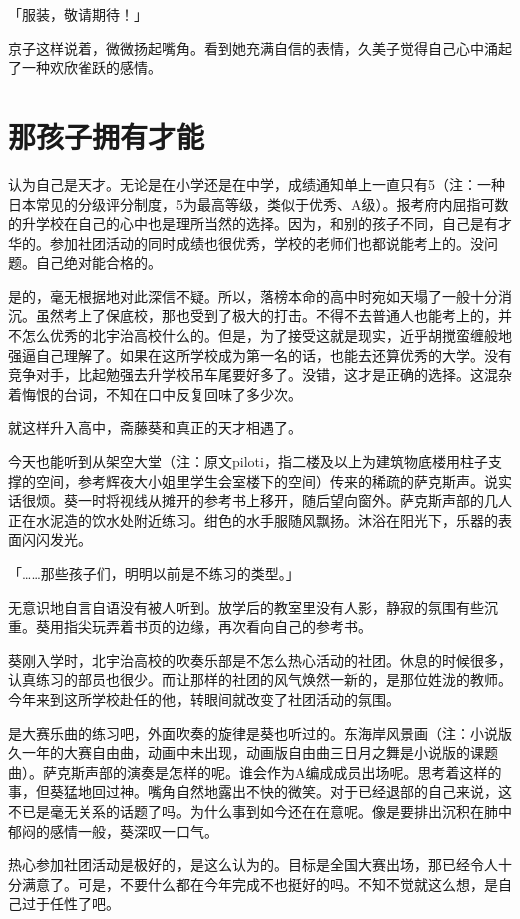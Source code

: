 \documentclass[UTF8]{ctexart}
\begin{document}
    「服装，敬请期待！」

    京子这样说着，微微扬起嘴角。看到她充满自信的表情，久美子觉得自己心中涌起了一种欢欣雀跃的感情。
    \section{那孩子拥有才能}
    认为自己是天才。无论是在小学还是在中学，成绩通知单上一直只有5（注：一种日本常见的分级评分制度，5为最高等级，类似于优秀、A级）。报考府内屈指可数的升学校在自己的心中也是理所当然的选择。因为，和别的孩子不同，自己是有才华的。参加社团活动的同时成绩也很优秀，学校的老师们也都说能考上的。没问题。自己绝对能合格的。

    是的，毫无根据地对此深信不疑。所以，落榜本命的高中时宛如天塌了一般十分消沉。虽然考上了保底校，那也受到了极大的打击。不得不去普通人也能考上的，并不怎么优秀的北宇治高校什么的。但是，为了接受这就是现实，近乎胡搅蛮缠般地强逼自己理解了。如果在这所学校成为第一名的话，也能去还算优秀的大学。没有竞争对手，比起勉强去升学校吊车尾要好多了。没错，这才是正确的选择。这混杂着悔恨的台词，不知在口中反复回味了多少次。

    就这样升入高中，斋藤葵和真正的天才相遇了。

    今天也能听到从架空大堂（注：原文piloti，指二楼及以上为建筑物底楼用柱子支撑的空间，参考辉夜大小姐里学生会室楼下的空间）传来的稀疏的萨克斯声。说实话很烦。葵一时将视线从摊开的参考书上移开，随后望向窗外。萨克斯声部的几人正在水泥造的饮水处附近练习。绀色的水手服随风飘扬。沐浴在阳光下，乐器的表面闪闪发光。

    「……那些孩子们，明明以前是不练习的类型。」

    无意识地自言自语没有被人听到。放学后的教室里没有人影，静寂的氛围有些沉重。葵用指尖玩弄着书页的边缘，再次看向自己的参考书。

    葵刚入学时，北宇治高校的吹奏乐部是不怎么热心活动的社团。休息的时候很多，认真练习的部员也很少。而让那样的社团的风气焕然一新的，是那位姓泷的教师。今年来到这所学校赴任的他，转眼间就改变了社团活动的氛围。

    是大赛乐曲的练习吧，外面吹奏的旋律是葵也听过的。东海岸风景画（注：小说版久一年的大赛自由曲，动画中未出现，动画版自由曲三日月之舞是小说版的课题曲）。萨克斯声部的演奏是怎样的呢。谁会作为A编成成员出场呢。思考着这样的事，但葵猛地回过神。嘴角自然地露出不快的微笑。对于已经退部的自己来说，这不已是毫无关系的话题了吗。为什么事到如今还在在意呢。像是要排出沉积在肺中郁闷的感情一般，葵深叹一口气。

    热心参加社团活动是极好的，是这么认为的。目标是全国大赛出场，那已经令人十分满意了。可是，不要什么都在今年完成不也挺好的吗。不知不觉就这么想，是自己过于任性了吧。
\end{document}
